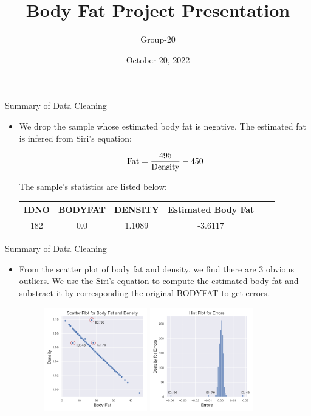 \documentclass{ctexbeamer}        %
\begin{document}
\title{Body Fat Project Presentation}
\author{Group-20}
\date{October 20, 2022}
\frame{\titlepage}


\begin{frame}{Summary of Data Cleaning}

\begin{itemize}
\item We drop the sample whose estimated body fat is negative. The estimated fat is infered from Siri's equation:

$$
\rm Fat=\frac{495}{Density} - 450
$$

The sample's statistics are listed below:
\newline

\begin{tabular}{cccccc}
   \toprule
   IDNO & BODYFAT & DENSITY & Estimated Body Fat\\
   \midrule
   182 & 0.0 & 1.1089 & -3.6117 \\
   \bottomrule
\end{tabular}
\end{itemize}
\end{frame}


\begin{frame}{Summary of Data Cleaning}

\begin{itemize}
\item From the scatter plot of body fat and density, we find there are 3 obvious outliers. We use the Siri's equation to compute the estimated body fat and substract it by corresponding the original BODYFAT to get errors.

\begin{figure}
   \includegraphics[width=0.425\textwidth]{../image/scatter_plot_for_density_and_fat.png}
   \hfill
   \includegraphics[width=0.425\textwidth]{../image/hist_plot_for_errors.png}
\end{figure}
\end{itemize}

\end{frame}
\end{document}
